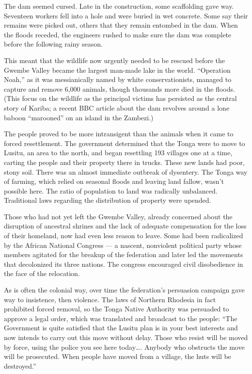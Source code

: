 The dam seemed cursed. Late in the construction, some scaffolding gave
way. Seventeen workers fell into a hole and were buried in wet concrete.
Some say their remains were picked out, others that they remain entombed
in the dam. When the floods receded, the engineers rushed to make sure
the dam was complete before the following rainy season.

This meant that the wildlife now urgently needed to be rescued before
the Gwembe Valley became the largest man-made lake in the world.
``Operation Noah,'' as it was messianically named by white
conservationists, managed to capture and remove 6,000 animals, though
thousands more died in the floods. (This focus on the wildlife as the
principal victims has persisted as the central story of Kariba; a recent
BBC article about the dam revolves around a lone baboon ``marooned'' on
an island in the Zambezi.)

The people proved to be more intransigent than the animals when it came
to forced resettlement. The government determined that the Tonga were to
move to Lusitu, an area to the north, and began resettling 193 villages
one at a time, carting the people and their property there in trucks.
These new lands had poor, stony soil. There was an almost immediate
outbreak of dysentery. The Tonga way of farming, which relied on
seasonal floods and leaving land fallow, wasn't possible here. The ratio
of population to land was radically unbalanced. Traditional laws
regarding the distribution of property were upended.

Those who had not yet left the Gwembe Valley, already concerned about
the disruption of ancestral shrines and the lack of adequate
compensation for the loss of their homeland, now had even less reason to
leave. Some had been radicalized by the African National Congress --- a
nascent, nonviolent political party whose members agitated for the
breakup of the federation and later led the movements that decolonized
its three nations. The congress encouraged civil disobedience in the
face of the relocation.

As is often the colonial way, over time the federation's persuasion
campaign gave way to insistence, then violence. The laws of Northern
Rhodesia in fact prohibited forced removal, so the Tonga Native
Authority was persuaded to approve a legal order, which was translated
and broadcast to the people: ``The Government is quite satisfied that
the Lusitu plan is in your best interests and now intends to carry out
this move without delay. Those who resist will be moved by force, using
the police you see here today\ldots{}. Anybody who obstructs the move
will be prosecuted. When people have moved from a village, the huts will
be destroyed.''


